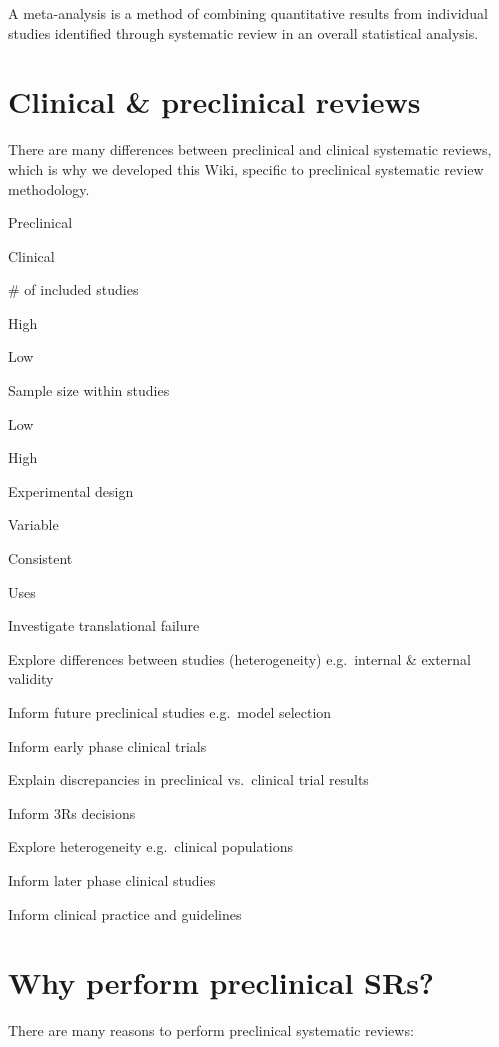 \documentclass[
]{book}
\begin{document}
A meta-analysis is a method of combining quantitative results from individual studies identified through systematic review in an overall statistical analysis.

\hypertarget{clinical-preclinical-reviews}{%
\section{Clinical \& preclinical reviews}\label{clinical-preclinical-reviews}}

There are many differences between preclinical and clinical systematic reviews, which is why we developed this Wiki, specific to preclinical systematic review methodology.

Preclinical

Clinical

\# of included studies

High

Low

Sample size within studies

Low

High

Experimental design

Variable

Consistent

Uses

Investigate translational failure

Explore differences between studies (heterogeneity) e.g.~internal \& external validity

Inform future preclinical studies e.g.~model selection

Inform early phase clinical trials

Explain discrepancies in preclinical vs.~clinical trial results

Inform 3Rs decisions

Explore heterogeneity e.g.~clinical populations

Inform later phase clinical studies

Inform clinical practice and guidelines

\hypertarget{why-perform-preclinical-srs}{%
\section{Why perform preclinical SRs?}\label{why-perform-preclinical-srs}}

There are many reasons to perform preclinical systematic reviews:
\end{document}
